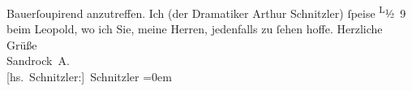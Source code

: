 \begin{ledgroupsized}[t]{13cm}
                  Bauerſoupirend anzutreffen. Ich (der Dramatiker Arthur Schnitzler)
               ſpeise \substVorne{}\textsuperscript{L}\substDazwischen{}½ 9\substHinten{} beim Leopold, wo ich Sie, meine Herren,
               jedenfalls zu ſehen hoffe.\pend
           \pstart
           Herzliche Grüße{\\[\baselineskip]}\spacefill\mbox{Sandrock A.}{\\[\baselineskip]}\spacefill\mbox{{[}hs. Schnitzler:{]} Schnitzler}\pend
           \leftskip=0em{}\endnumbering{}\end{ledgroupsized}  \newcommand{\dateiname}{L00364}\newcommand{\titel}{Adele Sandrock und Arthur Schnitzler an Richard Beer-Hofmann, 29. 8. 1894}\newcommand{\editorInnen}{Martin Anton Müller und Gerd-Hermann Susen}
      